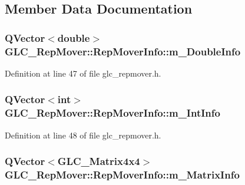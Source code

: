 \subsection{Member Data Documentation}
\hypertarget{struct_g_l_c___rep_mover_1_1_rep_mover_info_af10be33e0672616879167bfc134cc57e}{
\subsubsection[{m\-\_\-\-Double\-Info}]{\setlength{\rightskip}{0pt plus 5cm}Q\-Vector$<${\bf double}$>$ G\-L\-C\-\_\-\-Rep\-Mover\-::\-Rep\-Mover\-Info\-::m\-\_\-\-Double\-Info}}\label{struct_g_l_c___rep_mover_1_1_rep_mover_info_af10be33e0672616879167bfc134cc57e}


Definition at line 47 of file glc\-\_\-repmover.\-h.

\hypertarget{struct_g_l_c___rep_mover_1_1_rep_mover_info_a5eba22be97c221929f185fa2b3e932ed}{
\subsubsection[{m\-\_\-\-Int\-Info}]{\setlength{\rightskip}{0pt plus 5cm}Q\-Vector$<${\bf int}$>$ G\-L\-C\-\_\-\-Rep\-Mover\-::\-Rep\-Mover\-Info\-::m\-\_\-\-Int\-Info}}\label{struct_g_l_c___rep_mover_1_1_rep_mover_info_a5eba22be97c221929f185fa2b3e932ed}


Definition at line 48 of file glc\-\_\-repmover.\-h.

\hypertarget{struct_g_l_c___rep_mover_1_1_rep_mover_info_ae1a0718230d04cab13da611d6861f700}{
\subsubsection[{m\-\_\-\-Matrix\-Info}]{\setlength{\rightskip}{0pt plus 5cm}Q\-Vector$<${\bf G\-L\-C\-\_\-\-Matrix4x4}$>$ G\-L\-C\-\_\-\-Rep\-Mover\-::\-Rep\-Mover\-Info\-::m\-\_\-\-Matrix\-Info}}\label{struct_g_l_c___rep_mover_1_1_rep_mover_info_ae1a0718230d04cab13da611d6861f700}


